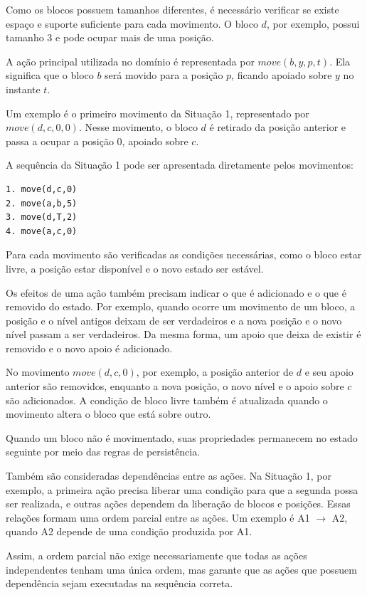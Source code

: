 \documentclass{article}
\begin{document}
Como os blocos possuem tamanhos diferentes, é necessário verificar se existe espaço e suporte suficiente para cada movimento. O bloco $d$, por exemplo, possui tamanho 3 e pode ocupar mais de uma posição.

A ação principal utilizada no domínio é representada por $move(b,y,p,t)$. Ela significa que o bloco $b$ será movido para a posição $p$, ficando apoiado sobre $y$ no instante $t$.

Um exemplo é o primeiro movimento da Situação 1, representado por $move(d,c,0,0)$. Nesse movimento, o bloco $d$ é retirado da posição anterior e passa a ocupar a posição 0, apoiado sobre $c$.

A sequência da Situação 1 pode ser apresentada diretamente pelos movimentos:

\begin{verbatim}
1. move(d,c,0)
2. move(a,b,5)
3. move(d,T,2)
4. move(a,c,0)
\end{verbatim}

Para cada movimento são verificadas as condições necessárias, como o bloco estar livre, a posição estar disponível e o novo estado ser estável.

Os efeitos de uma ação também precisam indicar o que é adicionado e o que é removido do estado. Por exemplo, quando ocorre um movimento de um bloco, a posição e o nível antigos deixam de ser verdadeiros e a nova posição e o novo nível passam a ser verdadeiros. Da mesma forma, um apoio que deixa de existir é removido e o novo apoio é adicionado.

No movimento $move(d,c,0)$, por exemplo, a posição anterior de $d$ e seu apoio anterior são removidos, enquanto a nova posição, o novo nível e o apoio sobre $c$ são adicionados. A condição de bloco livre também é atualizada quando o movimento altera o bloco que está sobre outro.

Quando um bloco não é movimentado, suas propriedades permanecem no estado seguinte por meio das regras de persistência.

Também são consideradas dependências entre as ações. Na Situação 1, por exemplo, a primeira ação precisa liberar uma condição para que a segunda possa ser realizada, e outras ações dependem da liberação de blocos e posições. Essas relações formam uma ordem parcial entre as ações. Um exemplo é A1 $\rightarrow$ A2, quando A2 depende de uma condição produzida por A1.

Assim, a ordem parcial não exige necessariamente que todas as ações independentes tenham uma única ordem, mas garante que as ações que possuem dependência sejam executadas na sequência correta.
\end{document}
